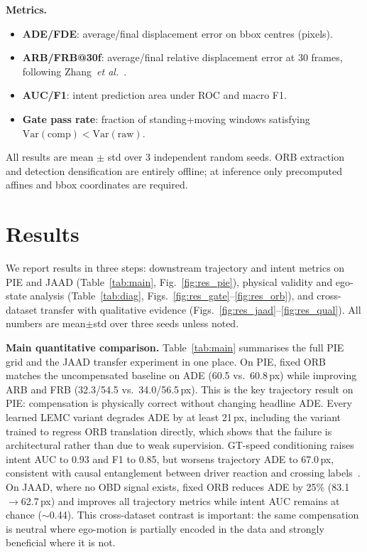 \documentclass[conference]{IEEEtran}
\begin{document}
\textbf{Metrics.}
\begin{itemize}[leftmargin=1.2em,itemsep=1pt,topsep=2pt]
  \item \textbf{ADE/FDE}: average/final displacement error on bbox centres (pixels).
  \item \textbf{ARB/FRB@30f}: average/final relative displacement error at 30 frames, following Zhang~\textit{et al.}~\cite{zhang2024decouple}.
  \item \textbf{AUC/F1}: intent prediction area under ROC and macro F1.
  \item \textbf{Gate pass rate}: fraction of standing+moving windows satisfying $\mathrm{Var}(\text{comp})<\mathrm{Var}(\text{raw})$.
\end{itemize}
All results are mean $\pm$ std over 3 independent random seeds.
ORB extraction and detection densification are entirely offline; at inference only precomputed affines and bbox coordinates are required.

\FloatBarrier
\newpage

\section{Results}
\label{sec:results}

We report results in three steps: downstream trajectory and intent metrics on PIE and JAAD (Table~\ref{tab:main}, Fig.~\ref{fig:res_pie}), physical validity and ego-state analysis (Table~\ref{tab:diag}, Figs.~\ref{fig:res_gate}--\ref{fig:res_orb}), and cross-dataset transfer with qualitative evidence (Figs.~\ref{fig:res_jaad}--\ref{fig:res_qual}).
All numbers are mean$\pm$std over three seeds unless noted.

\textbf{Main quantitative comparison.}
Table~\ref{tab:main} summarises the full PIE grid and the JAAD transfer experiment in one place.
On PIE, fixed ORB matches the uncompensated baseline on ADE (60.5 vs.\ 60.8\,px) while improving ARB and FRB (32.3/54.5 vs.\ 34.0/56.5\,px).
This is the key trajectory result on PIE: compensation is physically correct without changing headline ADE.
Every learned LEMC variant degrades ADE by at least 21\,px, including the variant trained to regress ORB translation directly, which shows that the failure is architectural rather than due to weak supervision.
GT-speed conditioning raises intent AUC to 0.93 and F1 to 0.85, but worsens trajectory ADE to 67.0\,px, consistent with causal entanglement between driver reaction and crossing labels~\cite{lim2025tits}.
On JAAD, where no OBD signal exists, fixed ORB reduces ADE by 25\% (83.1$\rightarrow$62.7\,px) and improves all trajectory metrics while intent AUC remains at chance ($\sim$0.44).
This cross-dataset contrast is important: the same compensation is neutral where ego-motion is partially encoded in the data and strongly beneficial where it is not.
\end{document}
